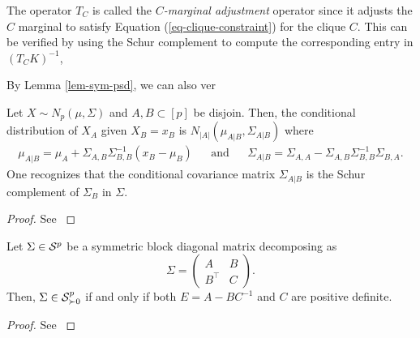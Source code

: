  
The operator $T_C$ is called the \textit{$C$-marginal adjustment} operator since it adjusts the $C$ marginal to satisfy Equation (\ref{eq-clique-constraint}) for the clique $C$. This can be verified by using the Schur complement to compute the corresponding entry in $(T_C K)^{-1}$,

By Lemma \ref{lem-sym-psd}, we can also ver

\newpage
\begin{lemma} \label{lem-gaussian-cond}
    Let $X \sim N_p(\mu, \Sigma)$ and $A, B \subset [p]$ be disjoin. Then, the conditional distribution of $X_A$ given $X_B = x_B$ is $N_|A|(\mu_{A|B}, \Sigma_{A|B})$ where
    \begin{align*}
        \mu_{A|B} = \mu_A + \Sigma_{A,B}\Sigma^{-1}_{B,B}(x_B - \mu_B) && \textrm{and} && \Sigma_{A|B} = \Sigma_{A,A} - \Sigma_{A,B}\Sigma^{-1}_{B,B}\Sigma_{B,A}.
    \end{align*} 
    One recognizes that the conditional covariance matrix $\Sigma_{A|B}$ is the Schur complement of $\Sigma_B$ in $\Sigma$.
\end{lemma}

\begin{proof}
    See \cite[Proposition C.5]{lauritzen1996}
\end{proof}

\begin{lemma} \label{lem-sym-psd}
    Let $\Sigma \in \S^p$ be a symmetric block diagonal matrix decomposing as
    \begin{equation*}
        \Sigma = \begin{pmatrix}
            A & B\\
            B^\top & C
        \end{pmatrix}.
    \end{equation*}
    Then, $\Sigma \in \S^p_{\succ 0}$ if and only if both $E = A - BC^{-1}$ and $C$ are positive definite.
\end{lemma}

\begin{proof}
    See \cite[Proposition B.1]{lauritzen1996}
\end{proof}